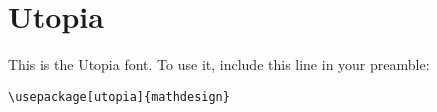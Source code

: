\documentclass{article}
\begin{document}
\section*{Utopia}
This is the Utopia font.
To use it, include this line in your preamble:
\begin{verbatim}
\usepackage[utopia]{mathdesign}
\end{verbatim}


\end{document}
